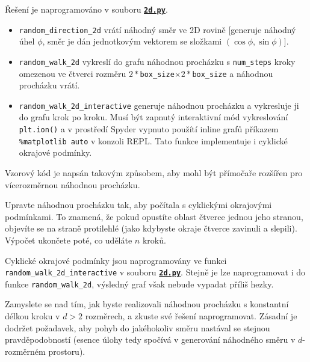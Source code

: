 \documentclass[a4paper,11pt,twoside]{article}
\def\code#1{\textnormal{\texttt{#1}}}
\def\ghfile#1#2{\textnormal{\textbf{\texttt{\href{https://github.com/PavelStransky/PCInPhysics/blob/main/#1#2}{#2}}}}}
\theoremstyle{red}
\theoremstyle{green}
\begin{document}
    \begin{solution}
        Řešení je naprogramováno v souboru \ghfile{python/randomwalk/}{2d.py}.
        \begin{itemize}
            \item \code{random_direction_2d} vrátí náhodný směr ve 2D rovině [generuje náhodný úhel $\phi$, směr je dán jednotkovým vektorem se složkami $(\cos\phi,\sin\phi)$].
            \item \code{random_walk_2d} vykreslí do grafu náhodnou procházku s \code{num_steps} kroky omezenou ve čtverci rozměru $2*$\code{box_size}$\times2*$\code{box_size} a náhodnou procházku vrátí.
            \item \code{random_walk_2d_interactive} generuje náhodnou procházku a vykresluje ji do grafu krok po kroku.
                Musí být zapnutý interaktivní mód vykreslování \code{plt.ion()} a v prostředí Spyder vypnuto použítí inline grafů příkazem \code{\%matplotlib auto} v konzoli REPL.
                Tato funkce implementuje i cyklické okrajové podmínky.
        \end{itemize}
        Vzorový kód je napsán takovým způsobem, aby mohl být přímočaře rozšířen pro vícerozměrnou náhodnou procházku.
    \end{solution}
    
    \begin{solved}
        Upravte náhodnou procházku tak, aby počítala s cyklickými okrajovými podmínkami.
        To znamená, že pokud opustíte oblast čtverce jednou jeho stranou, objevíte se na straně protilehlé (jako kdybyste okraje čtverce zavinuli a slepili).
        Výpočet ukončete poté, co uděláte $n$ kroků.
    \end{solved}

    \begin{solution}
        Cyklické okrajové podmínky jsou naprogramovány ve funkci \code{random_walk_2d_inter\-active} v souboru \ghfile{python/randomwalk/}{2d.py}.
        Stejně je lze naprogramovat i do funkce \code{random_walk_2d}, výsledný graf však nebude vypadat příliš hezky.
    \end{solution}

    \begin{solved}\label{task:NahodnaProchazka}
        Zamyslete se nad tím, jak byste realizovali náhodnou procházku s konstantní délkou kroku v $d>2$ rozměrech, a zkuste své řešení naprogramovat.
        Zásadní je dodržet požadavek, aby pohyb do jakéhokoliv směru nastával se stejnou pravděpodobností (esence úlohy tedy spočívá v generování náhodného směru v $d$-rozměrném prostoru).
    \end{solved}
\end{document}
